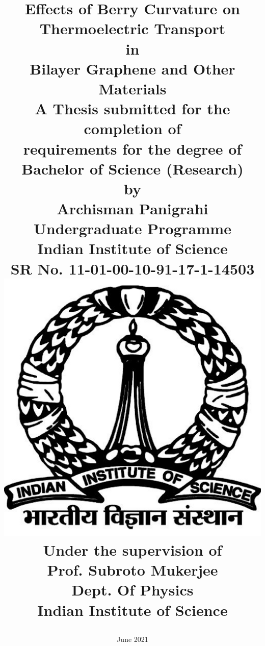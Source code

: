 \documentclass{report}
\begin{document}


%





\title{
	\sc
	\Huge{Effects of Berry Curvature on Thermoelectric Transport}\\
	\Large{in}\\
	\Huge{Bilayer Graphene and Other Materials}
	\\[40pt]
	\large{A Thesis submitted for the completion of}
	\\[5pt]
	\large{requirements for the degree of}
	\\[15pt]
	\Large{Bachelor of Science (Research)}
	\\[15pt]
	\normalsize{by}
	\\[10pt]
	\large{Archisman Panigrahi}
	\\[5pt]
	\normalsize{Undergraduate Programme}
	\\[5pt]
	\normalsize{Indian Institute of Science}
	\\[5pt]
	\normalsize{SR No.}
	\normalsize{11-01-00-10-91-17-1-14503}
	\\[10pt]
	\includegraphics[scale=0.12]{Logo.png}
	\\[10pt]
	\normalsize{Under the supervision of}
	\\[10pt]
	\large{Prof. Subroto Mukerjee}\\[5pt]
	\normalsize{Dept. Of Physics}\\[5pt]
	\normalsize{Indian Institute of Science}
	\date{June 2021}
}
\end{document}
